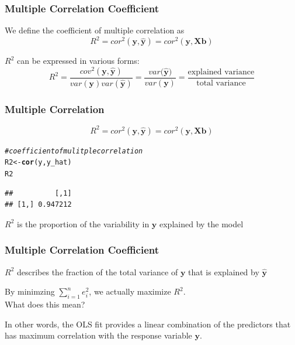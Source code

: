 \documentclass[12pt]{beamer}\usepackage[]{graphicx}\usepackage[]{color}
\makeatletter
\newcommand{\hlcom}[1]{\textcolor[rgb]{0.678,0.584,0.686}{\textit{#1}}}%
\newcommand{\hlstd}[1]{\textcolor[rgb]{0.345,0.345,0.345}{#1}}%
\newcommand{\hlkwb}[1]{\textcolor[rgb]{0.69,0.353,0.396}{#1}}%
\newcommand{\hlkwd}[1]{\textcolor[rgb]{0.737,0.353,0.396}{\textbf{#1}}}%
\newenvironment{kframe}{%
 \def\at@end@of@kframe{}%
 \ifinner\ifhmode%
  \def\at@end@of@kframe{\end{minipage}}%
  \begin{minipage}{\columnwidth}%
 \fi\fi%
 \def\FrameCommand##1{\hskip\@totalleftmargin \hskip-\fboxsep
 \colorbox{shadecolor}{##1}\hskip-\fboxsep
     \hskip-\linewidth \hskip-\@totalleftmargin \hskip\columnwidth}%
 \MakeFramed {\advance\hsize-\width
   \@totalleftmargin\z@ \linewidth\hsize
   \@setminipage}}%
 {\par\unskip\endMakeFramed%
 \at@end@of@kframe}
\newenvironment{knitrout}{}{} %
\makeatother
\begin{document}

\begin{frame}
\frametitle{Multiple Correlation Coefficient}

We define the {\hilit coefficient of multiple correlation} as
$$
R^2 = cor^2(\mathbf{y, \hat{y}}) = cor^2(\mathbf{y, Xb})
$$

$R^2$ can be expressed in various forms:
$$
R^2 = \frac{cov^2(\mathbf{y, \hat{y}})}{var(\mathbf{y}) var(\mathbf{\hat{y}})} =
\frac{var({\mathbf{\hat{y}})}}{var(\mathbf{y})} = 
\frac{\text{explained variance}}{\text{total variance}}
$$

\end{frame}


\begin{frame}[fragile]
\frametitle{Multiple Correlation}

$$
R^2 = cor^2(\mathbf{y, \hat{y}}) = cor^2(\mathbf{y, Xb})
$$

\begin{knitrout}\footnotesize
{}\color{fgcolor}\begin{kframe}
\begin{alltt}
\hlcom{# coefficient of mulitple correlation}
\hlstd{R2} \hlkwb{<-} \hlkwd{cor}\hlstd{(y, y_hat)}
\hlstd{R2}
\end{alltt}
\begin{verbatim}
##          [,1]
## [1,] 0.947212
\end{verbatim}
\end{kframe}
\end{knitrout}

$R^2$ is the proportion of the variability in $\mathbf{y}$ explained
by the model

\end{frame}


\begin{frame}
\frametitle{Multiple Correlation Coefficient}

$R^2$ describes the fraction of the total variance of $\mathbf{y}$ that is 
explained by $\mathbf{\hat{y}}$

\bigskip
By minimzing $\sum_{i=1}^{n} e_{i}^{2}$, we actually maximize $R^2$. \\
{\mdlit What does this mean?}

\pause
\bigskip
In other words, the OLS fit provides a linear combination of the predictors
that has maximum correlation with the response variable $\mathbf{y}$.

\end{frame}
\end{document}
